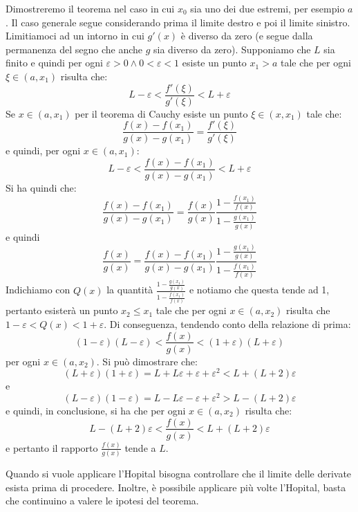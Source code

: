 \documentclass{report}
\begin{document}
\begin{myproof}
Dimostreremo il teorema nel caso in cui $x_0$ sia uno dei due estremi, per esempio $a$. Il caso generale segue considerando prima il limite destro e poi il limite sinistro. \\
Limitiamoci ad un intorno in cui $g'(x)$ è diverso da zero (e segue dalla permanenza del segno che anche $g$ sia diverso da zero). Supponiamo che $L$ sia finito e quindi per ogni $\varepsilon > 0 \wedge 0<\varepsilon<1$ esiste un punto $x_1>a$ tale che per ogni $\xi \in (a, x_1)$ risulta che:
$$
	L - \varepsilon < \frac{f'(\xi)}{g'(\xi)} < L + \varepsilon
$$
Se $x \in (a, x_1)$ per il teorema di Cauchy esiste un punto $\xi \in (x, x_1)$ tale che:
$$
	\frac{f(x)-f(x_1)}{g(x)-g(x_1)} = \frac{f'(\xi)}{g'(\xi)}
$$
e quindi, per ogni $x \in (a, x_1)$:
$$
	L - \varepsilon < \frac{f(x)-f(x_1)}{g(x)-g(x_1)} < L + \varepsilon
$$
Si ha quindi che:
$$
	\frac{f(x)-f(x_1)}{g(x)-g(x_1)} = \frac{f(x)}{g(x)}\frac{1-\frac{f(x_1)}{f(x)}}{1-\frac{g(x_1)}{g(x)}}
$$
e quindi
$$
	\frac{f(x)}{g(x)} = \frac{f(x)-f(x_1)}{g(x)-g(x_1)}\frac{1-\frac{g(x_1)}{g(x)}}{1-\frac{f(x_1)}{f(x)}}
$$
Indichiamo con $Q(x)$ la quantità $\frac{1-\frac{g(x_1)}{g(x)}}{1-\frac{f(x_1)}{f(x)}}$ e notiamo che questa tende ad 1, pertanto esisterà un punto $x_2 \leq x_1$ tale che per ogni $x \in (a, x_2)$ risulta che $1-\varepsilon < Q(x) < 1+\varepsilon$. Di conseguenza, tendendo conto della relazione di prima:
$$
	(1-\varepsilon)(L-\varepsilon) < \frac{f(x)}{g(x)} < (1+\varepsilon)(L+\varepsilon)
$$
per ogni $x \in (a, x_2)$. Si può dimostrare che:
$$
(L+\varepsilon)(1+\varepsilon) = L + L\varepsilon + \varepsilon + \varepsilon^2 < L+(L+2)\varepsilon
$$
e
$$
(L - \varepsilon)(1 - \varepsilon) = L - L\varepsilon - \varepsilon + \varepsilon^2 > L - (L + 2)\varepsilon
$$
e quindi, in conclusione, si ha che per ogni $x \in (a, x_2)$ risulta che:
$$
	L - (L+2)\varepsilon < \frac{f(x)}{g(x)} < L + (L+2)\varepsilon
$$
e pertanto il rapporto $\frac{f(x)}{g(x)}$ tende a $L$.
\end{myproof}
\par\smallskip\noindent Quando si vuole applicare l'Hopital bisogna controllare che il limite delle derivate esista prima di procedere. Inoltre, è possibile applicare più volte l'Hopital, basta che continuino a valere le ipotesi del teorema.
\end{document}
